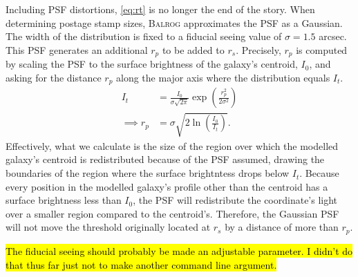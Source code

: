 \documentclass[12pt]{book}
\newcommand{\balrog}{\textsc{Balrog}}
\begin{document}
Including PSF distortions, \autoref{eq:rt} is no longer the end of the story.
When determining postage stamp sizes, \balrog{} approximates the PSF as a Gaussian.
The width of the distribution is fixed to a fiducial seeing value of $\sigma = 1.5$ arcsec.
This PSF generates an additional $r_p$ to be added to $r_s$. 
Precisely, $r_p$ is computed by scaling the PSF to the surface brightness of
the galaxy's centroid, $I_0$, and asking for the distance $r_p$ 
along the major axis where the distribution equals $I_t$.
\begin{align}
I_{t} &= \frac{I_0}{\sigma \sqrt{2 \pi}} \exp \left(\frac{ r_p^2}{2 \sigma^2}  \right) \\
\implies r_p &= \sigma \sqrt{2 \ln \left( \frac{I_0}{I_t}  \right)}.
\end{align}
Effectively, what we calculate is the size of the region over which 
the modelled galaxy's centroid is redistributed because of the PSF assumed,
drawing the boundaries of the region where the surface brightntess drops below $I_t$.
Because every position in the modelled galaxy's profile other than the centroid 
has a surface brightness less than $I_0$,
the PSF will redistribute the coordinate's light over a smaller region compared to the centroid's.
Therefore, the Gaussian PSF will not move the threshold originally located at $r_s$ 
by a distance of more than $r_p$.


\hl{The fiducial seeing should probably be made an adjustable parameter. I didn't do that thus far just not to make another command line argument.}



\end{document}
